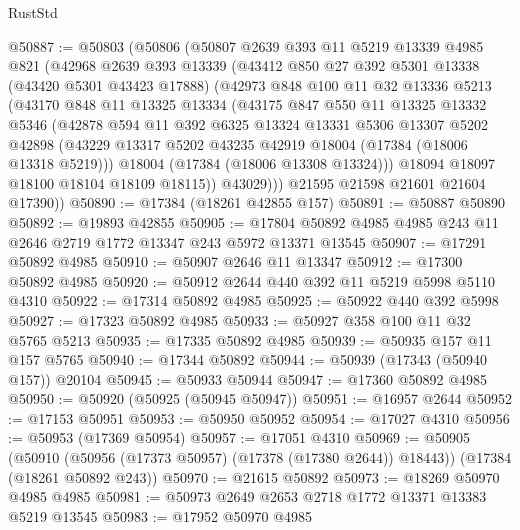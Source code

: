 \begin{lexlean}{RustStd}
\begin{coremodule}
@50887 := @50803
    (@50806
      (@50807
        @2639
        @393
        @11
        @5219
        @13339
        @4985
        @821
        (@42968
          @2639
          @393
          @13339
          (@43412
            @850
            @27
            @392
            @5301
            @13338
            (@43420 @5301 @43423 @17888)
            (@42973
              @848
              @100
              @11
              @32
              @13336
              @5213
              (@43170
                @848
                @11
                @13325
                @13334
                (@43175
                  @847
                  @550
                  @11
                  @13325
                  @13332
                  @5346
                  (@42878
                    @594
                    @11
                    @392
                    @6325
                    @13324
                    @13331
                    @5306
                    @13307
                    @5202
                    @42898
                    (@43229 @13317 @5202 @43235 @42919 @18004 (@17384 (@18006 @13318 @5219)))
                    @18004
                    (@17384 (@18006 @13308 @13324)))
                  @18094
                  @18097
                  @18100
                  @18104
                  @18109
                  @18115))
              @43029)))
        @21595
        @21598
        @21601
        @21604
        @17390))
@50890 := @17384 (@18261 @42855 @157)
@50891 := @50887 @50890
@50892 := @19893 @42855
@50905 := @17804 @50892 @4985 @4985 @243 @11 @2646 @2719 @1772 @13347 @243 @5972 @13371 @13545
@50907 := @17291 @50892 @4985
@50910 := @50907 @2646 @11 @13347
@50912 := @17300 @50892 @4985
@50920 := @50912 @2644 @440 @392 @11 @5219 @5998 @5110 @4310
@50922 := @17314 @50892 @4985
@50925 := @50922 @440 @392 @5998
@50927 := @17323 @50892 @4985
@50933 := @50927 @358 @100 @11 @32 @5765 @5213
@50935 := @17335 @50892 @4985
@50939 := @50935 @157 @11 @157 @5765
@50940 := @17344 @50892
@50944 := @50939 (@17343 (@50940 @157)) @20104
@50945 := @50933 @50944
@50947 := @17360 @50892 @4985
@50950 := @50920 (@50925 (@50945 @50947))
@50951 := @16957 @2644
@50952 := @17153 @50951
@50953 := @50950 @50952
@50954 := @17027 @4310
@50956 := @50953 (@17369 @50954)
@50957 := @17051 @4310
@50969 := @50905
    (@50910 (@50956 (@17373 @50957) (@17378 (@17380 @2644)) @18443))
    (@17384 (@18261 @50892 @243))
@50970 := @21615 @50892
@50973 := @18269 @50970 @4985 @4985
@50981 := @50973 @2649 @2653 @2718 @1772 @13371 @13383 @5219 @13545
@50983 := @17952 @50970 @4985

\end{coremodule}
\end{lexlean}
